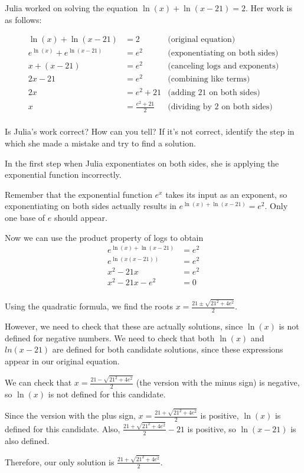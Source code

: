 \documentclass[noauthor]{ximera}
\begin{document}
\begin{problem}
Julia worked on solving the equation \(\ln(x) + \ln(x - 21) = 2\). Her
work is as follows:

\begin{align*}
\ln(x) + \ln(x - 21) & = 2 & \text{(original equation)}\\
e^{\ln(x)} + e^{\ln(x - 21)} & = e^2 & \text{(exponentiating on both sides)} \\
x + (x - 21) & = e^2 & \text{(canceling logs and exponents)}\\
2x - 21 & = e^2 & \text{(combining like terms)}\\
2x & = e^2 + 21 & \text{(adding 21 on both sides)}\\
x & = \frac{e^2 + 21}{2} & \text{(dividing by 2 on both sides)}\\
\end{align*}

Is Julia's work correct? How can you tell? If it's not correct, identify
the step in which she made a mistake and try to find a solution.

\begin{explanation}
In the first step when Julia exponentiates on both sides, she is applying the exponential function incorrectly.

Remember that the exponential function \(e^x\) takes its input as an exponent, so exponentiating on both sides actually results in 
\(e^{\ln(x) + \ln(x - 21)} = e^2\). Only one base of \(e\) should appear. 

Now we can use the product property of logs to obtain
\begin{align*}
    e^{\ln(x) + \ln(x - 21)} & = e^2 \\
    e^{\ln(x(x - 21))} & = e^2 \\
    x^2 - 21x & = e^2 \\
    x^2 - 21x - e^2 & = 0\\
\end{align*}

Using the quadratic formula, we find the roots \(x = \frac{21 \pm \sqrt{21^2 + 4e^2}}{2}\).

However, we need to check that these are actually solutions, since \(\ln(x)\) is not defined for negative numbers. 
We need to check that both \(\ln(x)\) and \(ln(x - 21)\) are defined for both candidate solutions, since these expressions
appear in our original equation. 

We can check that \(x = \frac{21 - \sqrt{21^2 + 4e^2}}{2}\) (the version with the minus sign) is negative, so \(\ln(x)\) 
is not defined for this candidate.

Since the version with the plus sign, \(x = \frac{21 + \sqrt{21^2 + 4e^2}}{2}\) is positive, \(\ln(x)\) is defined for this candidate.
Also, \(\frac{21 + \sqrt{21^2 + 4e^2}}{2} - 21\) is positive, so \(\ln(x - 21)\) is also defined.

Therefore, our only solution is \(\frac{21 + \sqrt{21^2 + 4e^2}}{2}\).
\end{explanation}
\end{problem}
\end{document}
